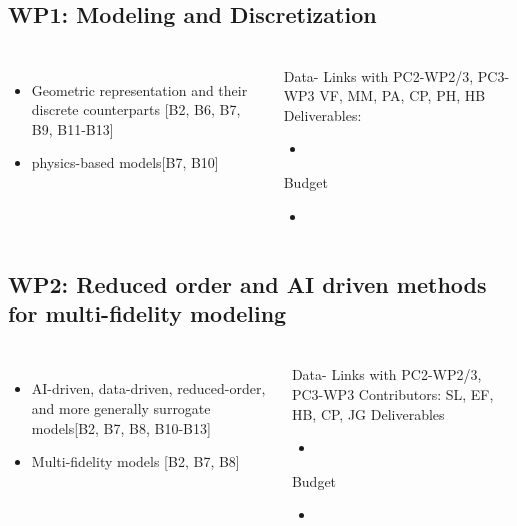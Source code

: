 \subsection{WP1: Modeling and Discretization}
\begin{frame}
  \frametitle{\insertsectionhead}
  \framesubtitle{\insertsubsectionhead}

  \begin{columns}
    \begin{itemize}
      \item Geometric representation and their discrete counterparts [B2, B6, B7, B9, B11-B13] 
      \item physics-based models[B7, B10] 
    \end{itemize}
  
  \begin{alertblock}{Data- Links with PC2-WP2/3, PC3-WP3  }
    VF, MM, PA, CP, PH, HB
    Deliverables:
    \begin{itemize}
      \item 
    \end{itemize}
    Budget
    \begin{itemize}
      \item 
    \end{itemize}
  \end{alertblock}

  \end{columns}
\end{frame}


\subsection{WP2: Reduced order and AI driven methods for multi-fidelity modeling} 
\begin{frame}
  \frametitle{\insertsectionhead}
  \framesubtitle{\insertsubsectionhead}

  \begin{columns}
    \begin{itemize}
      \item AI-driven, data-driven, reduced-order, and more generally surrogate models[B2, B7, B8, B10-B13]
      \item Multi-fidelity models [B2, B7, B8]
    \end{itemize}
  
    \begin{alertblock}{Data- Links with PC2-WP2/3, PC3-WP3}
    Contributors: SL, EF, HB, CP, JG
    Deliverables
    \begin{itemize}
      \item 
    \end{itemize}
    Budget
    \begin{itemize}
      \item 
    \end{itemize}
  \end{alertblock}

  \end{columns}
\end{frame}


